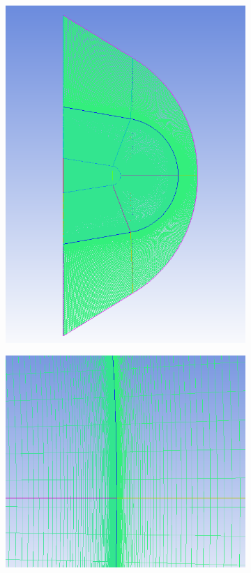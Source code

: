 \begin{figure}[H]
\begin{center}
\begin{subfigure}{0.6\textwidth}
\includegraphics[width=\textwidth]{chapter1_introduction/pictures/icem/castest_fluid_solid/mesh1.PNG}
\label{fig:subim1}
\end{subfigure}
\begin{subfigure}{0.6\textwidth}
\includegraphics[width=\textwidth]{chapter1_introduction/pictures/icem/castest_fluid_solid/mesh2.PNG}

\end{subfigure}
\end{center}
\end{figure}
